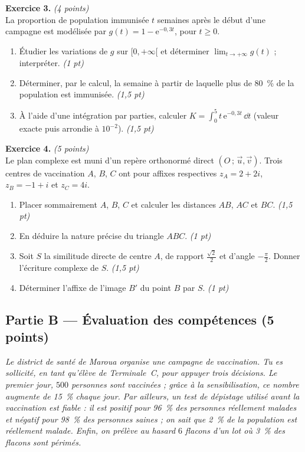 \smallskip
\noindent\textbf{Exercice 3.} \hfill\textit{(4 points)}\\
La proportion de population immunisée $t$ semaines après le début d'une campagne est
modélisée par $g(t)=1-\mathrm{e}^{-0{,}3t}$, pour $t\ge0$.
\begin{enumerate}[label=\arabic*)]
\item Étudier les variations de $g$ sur $[0,+\infty[$ et déterminer $\displaystyle\lim_{t\to+\infty}g(t)$ ; interpréter. \hfill\textit{(1 pt)}
\item Déterminer, par le calcul, la semaine à partir de laquelle plus de \SI{80}{\percent} de
la population est immunisée. \hfill\textit{(1,5 pt)}
\item À l'aide d'une intégration par parties, calculer
$\displaystyle K=\int_0^{5}t\,\mathrm{e}^{-0{,}3t}\,\dd t$ (valeur exacte puis arrondie à $10^{-2}$). \hfill\textit{(1,5 pt)}
\end{enumerate}

\smallskip
\noindent\textbf{Exercice 4.} \hfill\textit{(5 points)}\\
Le plan complexe est muni d'un repère orthonormé direct $(O\,;\,\vec u,\vec v)$. Trois
centres de vaccination $A$, $B$, $C$ ont pour affixes respectives
$z_A=2+2i$, $z_B=-1+i$ et $z_C=4i$.
\begin{enumerate}[label=\arabic*)]
\item Placer sommairement $A$, $B$, $C$ et calculer les distances $AB$, $AC$ et $BC$. \hfill\textit{(1,5 pt)}
\item En déduire la nature précise du triangle $ABC$. \hfill\textit{(1 pt)}
\item Soit $S$ la similitude directe de centre $A$, de rapport $\frac{\sqrt2}{2}$ et
d'angle $-\frac\pi2$. Donner l'écriture complexe de $S$. \hfill\textit{(1,5 pt)}
\item Déterminer l'affixe de l'image $B'$ du point $B$ par $S$. \hfill\textit{(1 pt)}
\end{enumerate}

\subsection*{Partie B — Évaluation des compétences \hfill (5 points)}

\noindent\textit{Le district de santé de Maroua organise une campagne de vaccination. Tu es
sollicité, en tant qu'élève de Terminale~C, pour appuyer trois décisions. Le premier jour,
$500$ personnes sont vaccinées ; grâce à la sensibilisation, ce nombre augmente de
\SI{15}{\percent} chaque jour. Par ailleurs, un test de dépistage utilisé avant la vaccination
est fiable : il est positif pour \SI{96}{\percent} des personnes réellement malades et
négatif pour \SI{98}{\percent} des personnes saines ; on sait que \SI{2}{\percent} de la
population est réellement malade. Enfin, on prélève au hasard $6$ flacons d'un lot où
\SI{3}{\percent} des flacons sont périmés.}

